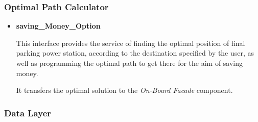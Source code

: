 \documentclass[a4paper,11pt]{article}
\begin{document}
		\subsubsection{Optimal Path Calculator}
			\begin{itemize}
				\item \textbf{saving\_Money\_Option}

This interface provides the service of finding the optimal position of final parking power station, according to the destination specified by the user, as well as programming the optimal path to get there for the aim of saving money.

It transfers the optimal solution to the \textsl{On-Board Facade} component.
			\end{itemize}
			
		\subsubsection{Data Layer}
\end{document}
